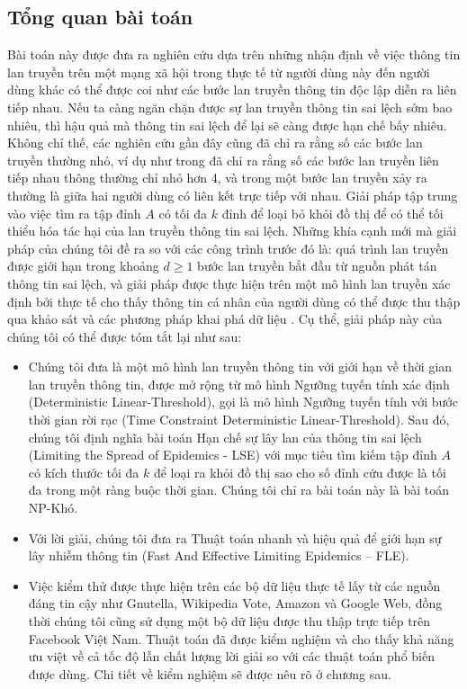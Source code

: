 \subsection{Tổng quan bài toán}
Bài toán này được đưa ra nghiên cứu dựa trên những nhận định về việc thông tin lan truyền trên một mạng xã hội trong thực tế từ người dùng này đến người dùng khác có thể được coi như các bước lan truyền thông tin độc lập diễn ra liên tiếp nhau. Nếu ta càng ngăn chặn được sự lan truyền thông tin sai lệch sớm bao nhiêu, thì hậu quả mà thông tin sai lệch để lại sẽ càng được hạn chế bấy nhiêu. Không chỉ thế, các nghiên cứu gần đây cũng đã chỉ ra rằng số các bước lan truyền thường nhỏ, ví dụ như trong \cite{cha23} đã chỉ ra rằng số các bước lan truyền liên tiếp nhau thông thường chỉ nhỏ hơn 4, và trong \cite{lesk16} một bước lan truyền xảy ra thường là giữa hai người dùng có liên kết trực tiếp với nhau.
Giải pháp tập trung vào việc tìm ra tập đỉnh $A$ có tối đa $k$ đỉnh để loại bỏ khỏi đồ thị để có thể tối thiểu hóa tác hại của lan truyền thông tin sai lệch. Những khía cạnh mới mà giải pháp của chúng tôi đề ra so với các công trình trước đó là: quá trình lan truyền được giới hạn trong khoảng $d \geq 1$ bước lan truyền bắt đầu từ nguồn phát tán thông tin sai lệch, và giải pháp được thực hiện trên một mô hình lan truyền xác định bởi thực tế cho thấy thông tin cá nhân của người dùng có thể được thu thập qua khảo sát và các phương pháp khai phá dữ liệu \cite{zaixin}. Cụ thể, giải pháp này của chúng tôi có thể được tóm tắt lại như sau:
\begin{itemize}
	\item Chúng tôi đưa là một mô hình lan truyền thông tin với giới hạn về thời gian lan truyền thông tin, được mở rộng từ mô hình Ngưỡng tuyến tính xác định (Deterministic Linear-Threshold), gọi là mô hình Ngưỡng tuyến tính với bước thời gian rời rạc (Time Constraint Deterministic Linear-Threshold). Sau đó, chúng tôi định nghĩa bài toán Hạn chế sự lây lan của thông tin sai lệch (Limiting the Spread of Epidemics - LSE) với mục tiêu tìm kiếm tập đỉnh $A$ có kích thước tối đa $k$ để loại ra khỏi đồ thị sao cho số đỉnh cứu được là tối đa trong một ràng buộc thời gian. Chúng tôi chỉ ra bài toán này là bài toán NP-Khó.
	\item Với lời giải, chúng tôi đưa ra Thuật toán nhanh và hiệu quả để giới hạn sự lây nhiễm thông tin (Fast And Effective Limiting Epidemics – FLE).
	\item Việc kiểm thử được thực hiện trên các bộ dữ liệu thực tế lấy từ các nguồn đáng tin cậy như Gnutella, Wikipedia Vote, Amazon và Google Web, đồng thời chúng tôi cũng sử dụng một bộ dữ liệu được thu thập trực tiếp trên Facebook Việt Nam. Thuật toán đã được kiểm nghiệm và cho thấy khả năng ưu việt về cả tốc độ lẫn chất lượng lời giải so với các thuật toán phổ biến được dùng. Chi tiết về kiểm nghiệm sẽ được nêu rõ ở chương sau.
\end{itemize}  

